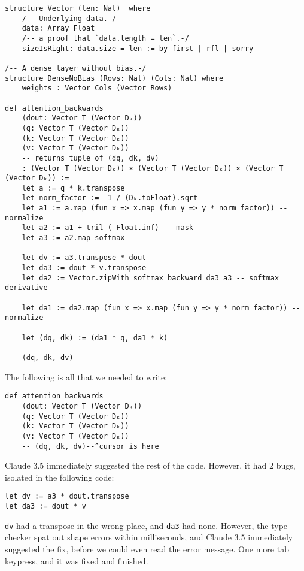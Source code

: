 \documentclass{article}
\begin{document}
\begin{verbatim}
structure Vector (len: Nat)  where
    /-- Underlying data.-/
    data: Array Float
    /-- a proof that `data.length = len`.-/
    sizeIsRight: data.size = len := by first | rfl | sorry

/-- A dense layer without bias.-/
structure DenseNoBias (Rows: Nat) (Cols: Nat) where
    weights : Vector Cols (Vector Rows)

def attention_backwards
    (dout: Vector T (Vector Dₖ))
    (q: Vector T (Vector Dₖ))
    (k: Vector T (Vector Dₖ))
    (v: Vector T (Vector Dₖ))
    -- returns tuple of (dq, dk, dv)
    : (Vector T (Vector Dₖ)) × (Vector T (Vector Dₖ)) × (Vector T (Vector Dₖ)) :=
    let a := q * k.transpose
    let norm_factor :=  1 / (Dₖ.toFloat).sqrt
    let a1 := a.map (fun x => x.map (fun y => y * norm_factor)) -- normalize
    let a2 := a1 + tril (-Float.inf) -- mask
    let a3 := a2.map softmax

    let dv := a3.transpose * dout
    let da3 := dout * v.transpose
    let da2 := Vector.zipWith softmax_backward da3 a3 -- softmax derivative

    let da1 := da2.map (fun x => x.map (fun y => y * norm_factor)) -- normalize

    let (dq, dk) := (da1 * q, da1 * k)

    (dq, dk, dv)
\end{verbatim}

The following is all that we needed to write:

\begin{verbatim}
def attention_backwards
    (dout: Vector T (Vector Dₖ))
    (q: Vector T (Vector Dₖ))
    (k: Vector T (Vector Dₖ))
    (v: Vector T (Vector Dₖ))
    -- (dq, dk, dv)--^cursor is here
\end{verbatim}

Claude 3.5 immediately suggested the rest of the code. However, it had 2 bugs, isolated in the following code:

\begin{verbatim}
let dv := a3 * dout.transpose
let da3 := dout * v
\end{verbatim}

\texttt{dv} had a transpose in the wrong place, and \texttt{da3} had none. However, the type checker spat out shape errors within milliseconds, and Claude 3.5 immediately suggested the fix, before we could even read the error message. One more tab keypress, and it was fixed and finished.
\end{document}
